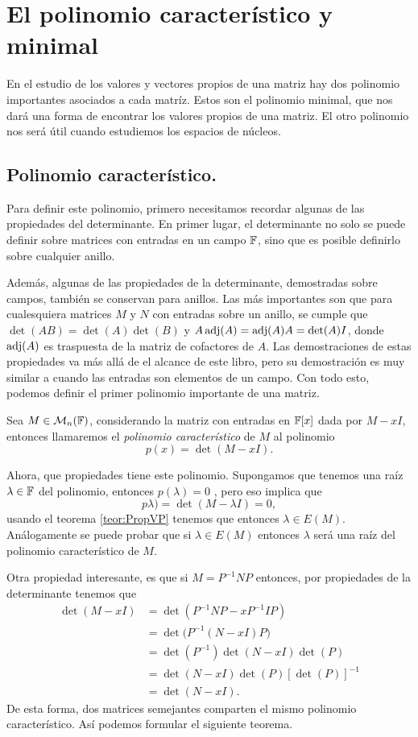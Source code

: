 \section{El polinomio característico y minimal}

En el estudio de los valores y vectores propios de una matriz hay dos polinomio importantes asociados a cada matríz. Estos son el polinomio minimal, que nos dará una forma de encontrar los valores propios de una matriz. El otro polinomio nos será útil cuando estudiemos los espacios de núcleos.

\subsection{Polinomio característico.}

Para definir este polinomio, primero necesitamos recordar algunas de las propiedades del determinante. En primer lugar, el determinante no solo se puede definir sobre matrices con entradas en un campo $\mathbb{F}$, sino que es posible definirlo sobre cualquier anillo.

Además, algunas de las propiedades de la determinante, demostradas sobre campos, también se conservan para anillos. Las más importantes son que para cualesquiera matrices $M$ y $N$ con entradas sobre un anillo, se cumple que $\det(AB) = \det(A)\det(B)$ y $A \operatorname{adj}(A) = \operatorname{adj}(A) A = \det(A) I$, donde $\operatorname{adj}(A)$ es traspuesta de la matriz de cofactores de $A$. Las demostraciones de estas propiedades va más allá de el alcance de este libro, pero su demostración es muy similar a cuando las entradas son elementos de un campo. Con todo esto, podemos definir el primer polinomio importante de una matriz.

\begin{defi}
  Sea $M \in \mathcal{M}_n(\mathbb{F})$, considerando la matriz con entradas en $\mathbb{F}[x]$ dada por $M-xI$, entonces llamaremos el \emph{polinomio característico} de $M$ al polinomio
    \[ p(x) = \det(M-xI). \]
\end{defi}

Ahora, que propiedades tiene este polinomio. Supongamos que tenemos una raíz $\lambda \in \mathbb{F}$ del polinomio, entonces $p(\lambda) = 0$ , pero eso implica que
\[ p\lambda) = \det(M-\lambda I) = 0, \]
usando el teorema \ref{teor:PropVP} tenemos que entonces $\lambda \in E(M)$. Análogamente se puede probar que si $\lambda \in E(M)$ entonces $\lambda$ será una raíz del polinomio característico de $M$.

Otra propiedad interesante, es que si $M = P^{-1} N P$ entonces, por propiedades de la determinante tenemos que
\begin{align*}
  \det(M - xI) &= \det(P^{-1}NP - x P^{-1}IP) \\
    &= \det\bigl(P^{-1}(N- xI)P\bigr) \\
    &= \det(P^{-1})\det(N - xI) \det(P) \\
    &= \det(N - xI) \det(P) [\det(P)]^{-1} \\
    &= \det(N - xI).
\end{align*}
De esta forma, dos matrices semejantes comparten el mismo polinomio característico. Así podemos formular el siguiente teorema.

